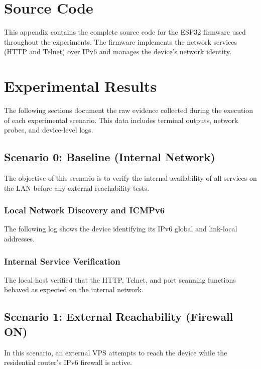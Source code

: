\chapter{Source Code}\label{app:source-code}
This appendix contains the complete source code for the ESP32 firmware used throughout the experiments. The firmware implements the network services (HTTP and Telnet) over IPv6 and manages the device's network identity.



\chapter{Experimental Results}\label{app:results}
The following sections document the raw evidence collected during the execution of each experimental scenario. This data includes terminal outputs, network probes, and device-level logs.

\section{Scenario 0: Baseline (Internal Network)}\label{app:results-s0}
The objective of this scenario is to verify the internal availability of all services on the LAN before any external reachability tests.

\subsection{Local Network Discovery and ICMPv6}
The following log shows the device identifying its IPv6 global and link-local addresses.


\subsection{Internal Service Verification}
The local host verified that the HTTP, Telnet, and port scanning functions behaved as expected on the internal network.

\section{Scenario 1: External Reachability (Firewall ON)}\label{app:results-s1}
In this scenario, an external VPS attempts to reach the device while the residential router's IPv6 firewall is active.

